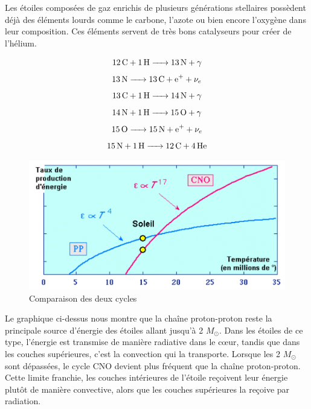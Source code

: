 Les étoiles composées de gaz enrichis de plusieurs générations stellaires possèdent déjà des éléments lourds comme le carbone, l’azote ou bien encore l’oxygène dans leur composition. Ces éléments servent de très bons catalyseurs pour créer de l’hélium.


\begin{equation}\ce{\ce{12C} + \ce{1H} -> \ce{13N} +$\gamma$}\end{equation}				     	
\begin{equation}\ce{\ce{13N} -> \ce{13C} + \ce{e+} + $\nu_{e}$ }\end{equation}					   	
\begin{equation}\ce{\ce{13C} + \ce{1H} -> \ce{14N} + $\gamma$ }\end{equation}	
\begin{equation}\ce{\ce{14N} + \ce{1H} -> \ce{15O} + $\gamma$}\end{equation}		
\begin{equation}\ce{\ce{15O} -> \ce{15N} + \ce{e+} + $\nu_{e}$	}\end{equation}	
\begin{equation}\ce{\ce{15N} + \ce{1H} -> \ce{12C} + \ce{4He}}\end{equation}\bigskip
	
	
\begin{figure}[H]
	\centering
	\includegraphics[scale=0.7]{images/cno-pp}
	\caption{Comparaison des deux cycles}
\end{figure}

Le graphique ci-dessus nous montre que la chaîne proton-proton reste la principale source d’énergie des étoiles allant jusqu’à 2 $M_\odot$. Dans les étoiles de ce type, l’énergie est transmise de manière radiative dans le cœur, tandis que dans les couches supérieures, c’est la convection qui la transporte. Lorsque les 2 $M_\odot$ sont dépassées, le cycle CNO devient plus fréquent que la chaîne proton-proton. Cette limite franchie, les couches intérieures de l’étoile reçoivent leur énergie plutôt de manière convective, alors que les couches supérieures la reçoive par radiation.\bigskip

